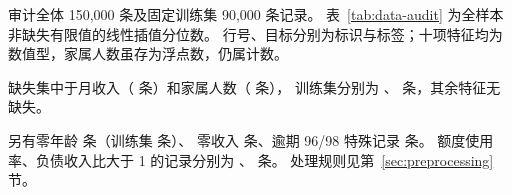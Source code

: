 

审计全体 150,000 条及固定训练集 90,000 条记录。
表~\ref{tab:data-audit} 为全样本非缺失有限值的线性插值分位数。
行号、目标分别为标识与标签；十项特征均为数值型，家属人数虽存为浮点数，仍属计数。

\begin{table}[htbp]
  \centering
  \caption{全样本特征审计摘要（比例变量保留原始比值）}
  \label{tab:data-audit}
  \footnotesize
  \setlength{\tabcolsep}{3pt}
  \renewcommand{\arraystretch}{1.03}
  
\end{table}

缺失集中于月收入（\AuditIncomeMissing{} 条）和家属人数（\AuditDependentsMissing{} 条），
训练集分别为 \AuditTrainIncomeMissing{}、\AuditTrainDependentsMissing{} 条，其余特征无缺失。


另有零年龄 \AuditAgeZero{} 条（训练集 \AuditTrainAgeZero{} 条）、
零收入 \AuditZeroIncome{} 条、逾期 96/98 特殊记录 \AuditSpecialLate{} 条。
额度使用率、负债收入比大于 1 的记录分别为 \AuditUtilizationAboveOne{}、\AuditDebtAboveOne{} 条。
处理规则见第~\ref{sec:preprocessing} 节。

